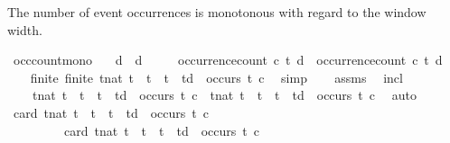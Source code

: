 \begin{isabellebody}
\begin{isamarkuptext}%
The number of event occurrences is monotonous with regard to the window width.%
\end{isamarkuptext}\isamarkuptrue%
\isamarkupfalse%
\ occ{\isacharunderscore}count{\isacharunderscore}mono{\isacharcolon}\isanewline
\ \ \ {\isacartoucheopen}d{\isacharprime}\ {\isasymge}\ d{\isacartoucheclose}\isanewline
\ \ \ \ \ {\isacartoucheopen}occurrence{\isacharunderscore}count\ c\ t\ d{\isacharprime}\ {\isasymge}\ occurrence{\isacharunderscore}count\ c\ t\ d{\isacartoucheclose}\isanewline
%
\isadelimproof
%
\endisadelimproof
%
\isatagproof
{}\isamarkupfalse%
\ {\isacharminus}\isanewline
\ \ \isamarkupfalse%
\ finite{\isacharcolon}\ {\isacartoucheopen}finite\ {\isacharbraceleft}t{\isacharcolon}{\isacharcolon}nat{\isachardot}\ t\ {\isasymle}\ t\ {\isasymand}\ t\ {\isacharless}\ td{\isacharprime}\ {\isasymand}\ occurs\ t\ c{\isacharbraceright}{\isacartoucheclose}\ \isamarkupfalse%
\ simp\isanewline
\ \ \isamarkupfalse%
\ assms\ \isamarkupfalse%
\ incl{\isacharcolon}\isanewline
\ \ \ \ {\isacartoucheopen}{\isacharbraceleft}t{\isacharcolon}{\isacharcolon}nat{\isachardot}\ t\ {\isasymle}\ t\ {\isasymand}\ t\ {\isacharless}\ td\ {\isasymand}\ occurs\ t\ c{\isacharbraceright}\ {\isasymsubseteq}\ {\isacharbraceleft}t{\isacharcolon}{\isacharcolon}nat{\isachardot}\ t\ {\isasymle}\ t\ {\isasymand}\ t\ {\isacharless}\ td{\isacharprime}\ {\isasymand}\ occurs\ t\ c{\isacharbraceright}{\isacartoucheclose}\ \isamarkupfalse%
\ auto\isanewline
\ \ \isamarkupfalse%
\ {\isacartoucheopen}card\ {\isacharbraceleft}t{\isacharcolon}{\isacharcolon}nat{\isachardot}\ t\ {\isasymle}\ t\ {\isasymand}\ t\ {\isacharless}\ td\ {\isasymand}\ occurs\ t\ c{\isacharbraceright}\isanewline
\ \ \ \ \ \ \ \ {\isasymle}\ card\ {\isacharbraceleft}t{\isacharcolon}{\isacharcolon}nat{\isachardot}\ t\ {\isasymle}\ t\ {\isasymand}\ t\ {\isacharless}\ td{\isacharprime}\ {\isasymand}\ occurs\ t\ c{\isacharbraceright}{\isacartoucheclose}\isanewline
\ \ \ \ \isamarkupfalse%

\end{isabellebody}
